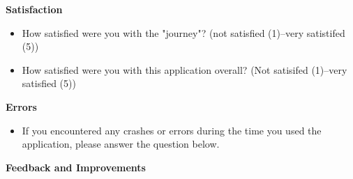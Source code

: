 \noindent \textbf{Satisfaction}

\begin{itemize}
    \item How satisfied were you with the "journey"? (not satisfied (1)--very satistifed (5))
    \item How satisfied were you with this application overall? (Not satisifed (1)--very satisfied (5))
\end{itemize}

\noindent \textbf{Errors}

\begin{itemize}
    \item If you encountered any crashes or errors during the time you used the application, please answer the question below.

\end{itemize}

\noindent \textbf{Feedback and Improvements}

